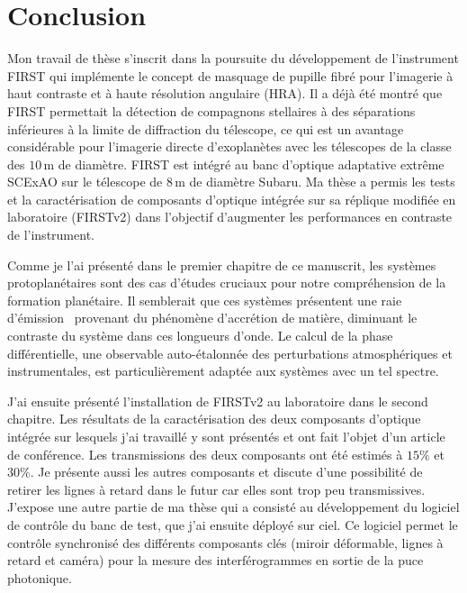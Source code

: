 \chapter*{Conclusion}


Mon travail de thèse s'inscrit dans la poursuite du développement de l'instrument FIRST qui implémente le concept de masquage de pupille fibré pour l'imagerie à haut contraste et à haute résolution angulaire (HRA). Il a déjà été montré que FIRST permettait la détection de compagnons stellaires à des séparations inférieures à la limite de diffraction du télescope, ce qui est un avantage considérable pour l'imagerie directe d'exoplanètes avec les télescopes de la classe des $10 \,$m de diamètre. FIRST est intégré au banc d'optique adaptative extrême SCExAO sur le télescope de $8 \,$m de diamètre Subaru. Ma thèse a permis les tests et la caractérisation de composants d'optique intégrée sur sa réplique modifiée en laboratoire (FIRSTv2) dans l'objectif d'augmenter les performances en contraste de l'instrument.

Comme je l'ai présenté dans le premier chapitre de ce manuscrit, les systèmes protoplanétaires sont des cas d'études cruciaux pour notre compréhension de la formation planétaire. Il semblerait que ces systèmes présentent une raie d'émission \ha~provenant du phénomène d'accrétion de matière, diminuant le contraste du système dans ces longueurs d'onde. Le calcul de la phase différentielle, une observable auto-étalonnée des perturbations atmosphériques et instrumentales, est particulièrement adaptée aux systèmes avec un tel spectre.

J'ai ensuite présenté l'installation de FIRSTv2 au laboratoire dans le second chapitre. Les résultats de la caractérisation des deux composants d'optique intégrée sur lesquels j'ai travaillé y sont présentés et ont fait l'objet d'un article de conférence. Les transmissions des deux composants ont été estimés à $15\%$ et $30\%$. Je présente aussi les autres composants et discute d'une possibilité de retirer les lignes à retard dans le futur car elles sont trop peu transmissives. J'expose une autre partie de ma thèse qui a consisté au développement du logiciel de contrôle du banc de test, que j'ai ensuite déployé sur ciel. Ce logiciel permet le contrôle synchronisé des différents composants clés (miroir déformable, lignes à retard et caméra) pour la mesure des interférogrammes en sortie de la puce photonique.

